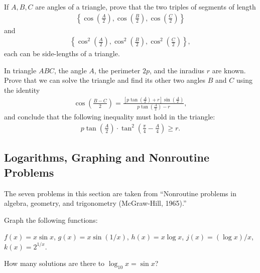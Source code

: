 \documentclass[12pt,a4paper]{memoir}
\theoremstyle{definition}
\begin{document}
\begin{question}
	If $A,B,C$ are angles of a triangle, prove that the two triples of segments of length
	\begin{align*}
		\left\{\cos\left(\frac{A}{2}\right), \cos\left(\frac{B}{2}\right), \cos\left(\frac{C}{2}\right)\right\}
	\end{align*}
	and
	\begin{align*}
		\left\{\cos^2\left(\frac{A}{2}\right), \cos^2\left(\frac{B}{2}\right), \cos^2\left(\frac{C}{2}\right)\right\},
	\end{align*}
	each can be side-lengths of a triangle.
\end{question}

\begin{question}
	In triangle $ABC$, the angle $A$, the perimeter $2p$, and the inradius $r$ are known. Prove that we can solve the triangle and find its other two angles $B$ and $C$ using the identity
	\begin{align*}
		\cos\left(\frac{B-C}{2}\right) = \frac{\displaystyle \left[p\tan\left(\frac{A}{2}\right)+r\right]\sin\left(\frac{A}{2}\right)}{\displaystyle p\tan\left(\frac{A}{2}\right)-r},
	\end{align*}
	and conclude that the following inequality must hold in the triangle:
	\begin{align*}
		p\tan\left(\frac{A}{2}\right)\cdot \tan^2\left(\frac{\pi}{4}-\frac{A}{4}\right) \geq r.
	\end{align*}
\end{question}

\newpage
\subsection{Logarithms, Graphing and Nonroutine Problems}
The seven problems in this section are taken from ``Nonroutine problems in algebra, geometry, and trigonometry (McGraw-Hill, 1965).''

\begin{question}[name={Nonroutine I}]
	Graph the following functions:
	\begin{tasks}
		\task $f(x)=x \sin x$,
		\task $g(x)=x \sin (1/x)$,
		\task $h(x)=x \log x$,
		\task $j(x)=(\log x)/x$,
		\task $k(x)=2^{1/x}$.
	\end{tasks}
\end{question}

\begin{question}[name={Nonroutine II}]
	How many solutions are there to $\log_{10} x = \sin x$?
\end{question}
\end{document}
